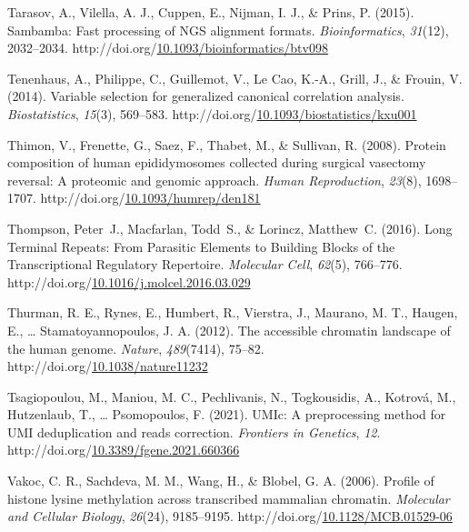 \documentclass[12pt,twoside]{reedthesis}
\newlength{\cslhangindent}
\newenvironment{CSLReferences}[2] %
 {%
  \setlength{\parindent}{0pt}
  \ifodd #1 \everypar{\setlength{\hangindent}{\cslhangindent}}\ignorespaces\fi
  \ifnum #2 > 0
  \setlength{\parskip}{#2\baselineskip}
  \fi
 }%
 {}
\begin{document}
\begin{CSLReferences}{1}{0}
\leavevmode{}%
Tarasov, A., Vilella, A. J., Cuppen, E., Nijman, I. J., \& Prins, P. (2015). Sambamba: Fast processing of NGS alignment formats. \emph{Bioinformatics}, \emph{31}(12), 2032--2034. http://doi.org/\href{https://doi.org/10.1093/bioinformatics/btv098}{10.1093/bioinformatics/btv098}

\leavevmode{}%
Tenenhaus, A., Philippe, C., Guillemot, V., Le Cao, K.-A., Grill, J., \& Frouin, V. (2014). Variable selection for generalized canonical correlation analysis. \emph{Biostatistics}, \emph{15}(3), 569--583. http://doi.org/\href{https://doi.org/10.1093/biostatistics/kxu001}{10.1093/biostatistics/kxu001}

\leavevmode{}%
Thimon, V., Frenette, G., Saez, F., Thabet, M., \& Sullivan, R. (2008). Protein composition of human epididymosomes collected during surgical vasectomy reversal: A proteomic and genomic approach. \emph{Human Reproduction}, \emph{23}(8), 1698--1707. http://doi.org/\href{https://doi.org/10.1093/humrep/den181}{10.1093/humrep/den181}

\leavevmode{}%
Thompson, Peter~J., Macfarlan, Todd~S., \& Lorincz, Matthew~C. (2016). Long Terminal Repeats: From Parasitic Elements to Building Blocks of the Transcriptional Regulatory Repertoire. \emph{Molecular Cell}, \emph{62}(5), 766--776. http://doi.org/\href{https://doi.org/10.1016/j.molcel.2016.03.029}{10.1016/j.molcel.2016.03.029}

\leavevmode{}%
Thurman, R. E., Rynes, E., Humbert, R., Vierstra, J., Maurano, M. T., Haugen, E., \ldots{} Stamatoyannopoulos, J. A. (2012). The accessible chromatin landscape of the human genome. \emph{Nature}, \emph{489}(7414), 75--82. http://doi.org/\href{https://doi.org/10.1038/nature11232}{10.1038/nature11232}

\leavevmode{}%
Tsagiopoulou, M., Maniou, M. C., Pechlivanis, N., Togkousidis, A., Kotrová, M., Hutzenlaub, T., \ldots{} Psomopoulos, F. (2021). UMIc: A preprocessing method for UMI deduplication and reads correction. \emph{Frontiers in Genetics}, \emph{12}. http://doi.org/\href{https://doi.org/10.3389/fgene.2021.660366}{10.3389/fgene.2021.660366}

\leavevmode{}%
Vakoc, C. R., Sachdeva, M. M., Wang, H., \& Blobel, G. A. (2006). Profile of histone lysine methylation across transcribed mammalian chromatin. \emph{Molecular and Cellular Biology}, \emph{26}(24), 9185--9195. http://doi.org/\href{https://doi.org/10.1128/MCB.01529-06}{10.1128/MCB.01529-06}


\end{CSLReferences}
\end{document}
